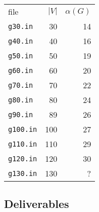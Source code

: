 \documentclass{tufte-handout}
\begin{document}
\begin{marginfigure}
\begin{tabular}{lrr}
file & $|V|$ & $\alpha(G)$\\
 \texttt{g30.in} & 30 & 14\\
 \texttt{g40.in} & 40 & 16\\
 \texttt{g50.in} & 50 & 19\\
 \texttt{g60.in} & 60 & 20\\
 \texttt{g70.in} & 70 & 22\\
 \texttt{g80.in} & 80 & 24\\
 \texttt{g90.in} & 89 & 26\\
 \texttt{g100.in} & 100 & 27\\
 \texttt{g110.in} & 110 & 29\\
 \texttt{g120.in} & 120 & 30\\
 \texttt{g130.in} & 130 &  ? 
\end{tabular}
\end{marginfigure}



\subsection{Deliverables}
\end{document}
